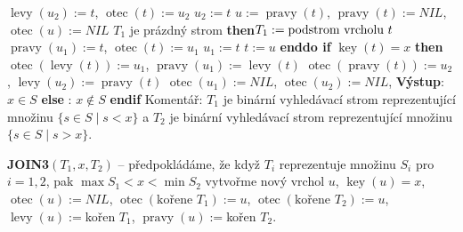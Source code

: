 \documentclass[a4paper,12pt]{article}
\DeclareMathOperator*{\otec}{otec}
\DeclareMathOperator*{\levy}{levy}
\DeclareMathOperator*{\pravy}{pravy}
\DeclareMathOperator*{\key}{key}
\newcommand{\algoritmus}[1]{
  {
  \setlength\fboxrule{0.5pt}

  \begin{boxedminipage}{0.8\textwidth}

 #1
  \end{boxedminipage}

  }
  }
\begin{document}
{\phantom{---------}$\levy(u_2):=t$, $\otec(t):=u_2$\newline 
{}\newline
\phantom{------}$u_2:=t$\newline 
{}\newline 
\phantom{------}$u:=\pravy(t)$, $\pravy(t):=NIL$, $\otec(u):=NIL$\newline
{} $T_1$ je prázdný strom {\bf \textsf{then}}\newline \phantom{---------}$T_1:=\text{\rm podstrom vrcholu }t$\newline
{}\newline 
\phantom{---------}$\pravy(u_1):=t$, $\otec(t):=u_1$\newline 
{}\newline
\phantom{------}$u_1:=t$\newline 
{}\newline 
\phantom{---}$t:=u$\newline 
{\bf \textsf{enddo}\newline 
\textsf{if}} $\key(t)=x$ {\bf \textsf{then}}\newline 
\phantom{---}$\otec(\levy(t)):=u_1$, $\pravy(u_1):=\levy(t)$\newline 
\phantom{---}$\otec(\pravy(t)):=u_2$, $\levy(u_2):=\pravy(t)$\newline 
\phantom{---}$\otec(u_1):=NIL$, $\otec(u_2):=NIL$, {\bf Výstup}: $x\in S$\newline 
{\bf \textsf{else}}\newline 
\phantom{---}{\bf Výstup}: $x\notin S$\newline 
{\bf \textsf{endif}\newline }
Komentář: $T_1$ je binární vyhledávací strom reprezentující 
mno\-ži\-nu 
$\{s\in S\mid s<x\}$ a $T_2$ je binární vyhledávací strom 
reprezentující množinu $\{s\in S\mid s>x\}$.
}\algoritmus{

{\bf JOIN3$(T_1,x,T_2)$} -- předpokládáme, že když $
T_i$ reprezentuje 
množinu $S_i$ pro $i=1,2$, pak $\max S_1<x<\min S_2$\newline 
vytvořme nový vrchol $u$, $\key(u)=x$, $\otec(u):=NIL$, \newline 
$\otec(\text{kořene }T_1):=u$, $\otec(\text{kořene }T_2):=u$, \newline 
$\levy(u):=$kořen $T_1$, $\pravy(u):=$kořen $T_2$.
}
\end{document}

